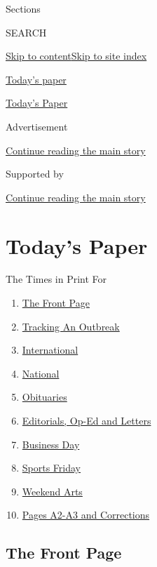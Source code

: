 Sections

SEARCH

\protect\hyperlink{site-content}{Skip to
content}\protect\hyperlink{site-index}{Skip to site index}

\href{https://www.nytimes3xbfgragh.onion/section/todayspaper}{Today's
paper}

\href{https://myaccount.nytimes3xbfgragh.onion/auth/login?response_type=cookie\&client_id=vi}{}

\href{https://www.nytimes3xbfgragh.onion/section/todayspaper}{Today's
Paper}

Advertisement

\protect\hyperlink{after-top}{Continue reading the main story}

Supported by

\protect\hyperlink{after-sponsor}{Continue reading the main story}

\hypertarget{todays-paper}{%
\section{Today's Paper}\label{todays-paper}}

The Times in Print For

\begin{enumerate}
\def\labelenumi{\arabic{enumi}.}
\tightlist
\item
  \protect\hyperlink{thefrontpage}{The Front Page}
\item
  \protect\hyperlink{trackinganoutbreak}{Tracking An Outbreak}
\item
  \protect\hyperlink{international}{International}
\item
  \protect\hyperlink{national}{National}
\item
  \protect\hyperlink{obituaries}{Obituaries}
\item
  \protect\hyperlink{editorialsux2cop-edandletters}{Editorials, Op-Ed
  and Letters}
\item
  \protect\hyperlink{businessday}{Business Day}
\item
  \protect\hyperlink{sportsfriday}{Sports Friday}
\item
  \protect\hyperlink{weekendarts}{Weekend Arts}
\item
  \protect\hyperlink{pagesa2-a3andcorrections}{Pages A2-A3 and
  Corrections}
\end{enumerate}

\hypertarget{the-front-page}{%
\subsection{The Front Page}\label{the-front-page}}

